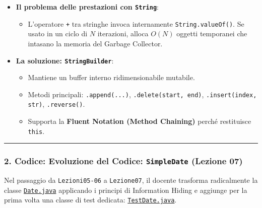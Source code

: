 \documentclass[11pt,a4paper]{article}
\newcommand{\passthrough}[1]{#1}
\providecommand{\tightlist}{\setlength{\itemsep}{0pt}\setlength{\parskip}{0pt}}
\begin{document}
\begin{itemize}
\tightlist
\item
  \textbf{Il problema delle prestazioni con
  \passthrough{\lstinline!String!}}:

  \begin{itemize}
  \tightlist
  \item
    L'operatore \passthrough{\lstinline!+!} tra stringhe invoca
    internamente \passthrough{\lstinline!String.valueOf()!}. Se usato in
    un ciclo di \(N\) iterazioni, alloca \(O(N)\) oggetti temporanei che
    intasano la memoria del Garbage Collector.
  \end{itemize}
\item
  \textbf{La soluzione: \passthrough{\lstinline!StringBuilder!}}:

  \begin{itemize}
  \tightlist
  \item
    Mantiene un buffer interno ridimensionabile mutabile.
  \item
    Metodi principali: \passthrough{\lstinline!.append(...)!},
    \passthrough{\lstinline!.delete(start, end)!},
    \passthrough{\lstinline!.insert(index, str)!},
    \passthrough{\lstinline!.reverse()!}.
  \item
    Supporta la \textbf{Fluent Notation (Method Chaining)} perché
    restituisce \passthrough{\lstinline!this!}.
  \end{itemize}
\end{itemize}

\begin{center}\rule{0.5\linewidth}{0.5pt}\end{center}

\subsubsection{\texorpdfstring{2. Codice: Evoluzione del Codice:
\texttt{SimpleDate} (Lezione
07)}{2. Codice: Evoluzione del Codice: SimpleDate (Lezione 07)}}\label{codice-evoluzione-del-codice-simpledate-lezione-07}

Nel passaggio da \passthrough{\lstinline!Lezioni05-06!} a
\passthrough{\lstinline!Lezione07!}, il docente trasforma radicalmente
la classe
\href{file:///home/wally/Documenti/GitHub/Programmazione-II/25-26/Teoria-e-Esercitazioni/Codice-20260902/Lezione07/SimpleDate/src/Date.java}{\passthrough{\lstinline!Date.java!}}
applicando i principi di Information Hiding e aggiunge per la prima
volta una classe di test dedicata:
\href{file:///home/wally/Documenti/GitHub/Programmazione-II/25-26/Teoria-e-Esercitazioni/Codice-20260902/Lezione07/SimpleDate/src/TestDate.java}{\passthrough{\lstinline!TestDate.java!}}.
\end{document}
